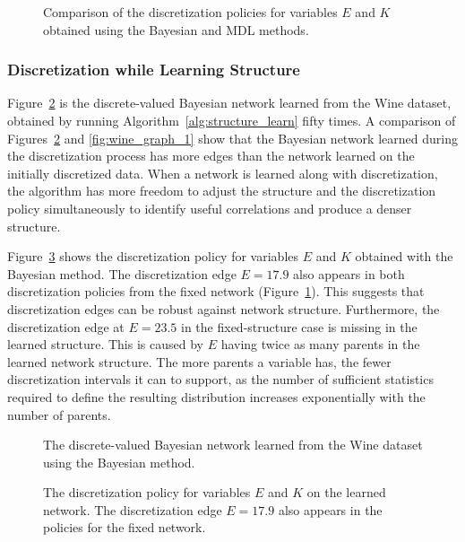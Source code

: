 \begin{figure}[ht]
  \centering
  
  \caption{Comparison of the discretization policies for variables $E$ and $K$ obtained using the Bayesian and MDL methods.}
  \label{fig:wine_exp1_distr}
\end{figure}

\subsubsection{Discretization while Learning Structure}
\label{subsubsec:wine_exp2}

Figure~\ref{fig:wine_graph_2} is the discrete-valued Bayesian network learned from the Wine dataset, obtained by running Algorithm~\ref{alg:structure_learn} fifty times.
A comparison of Figures~\ref{fig:wine_graph_2} and \ref{fig:wine_graph_1} show that the Bayesian network learned during the discretization process has more edges than the network learned on the initially discretized data.
When a network is learned along with discretization, the algorithm has more freedom to adjust the structure and the discretization policy simultaneously to identify useful correlations and produce a denser structure.

Figure~\ref{fig:wine_exp2_distr} shows the discretization policy for variables $E$ and $K$ obtained with the Bayesian method.
The discretization edge $E = 17.9$ also appears in both discretization policies from the fixed network (Figure~\ref{fig:wine_exp1_distr}).
This suggests that discretization edges can be robust against network structure.
Furthermore, the discretization edge at $E = 23.5$ in the fixed-structure case is missing in the learned structure.
This is caused by $E$ having twice as many parents in the learned network structure.
The more parents a variable has, the fewer discretization intervals it can to support, as the number of sufficient statistics required to define the resulting distribution increases exponentially with the number of parents.

\begin{figure}[ht]
  \centering
  \scalebox{0.7}{}
  \caption{The discrete-valued Bayesian network learned from the Wine dataset using the Bayesian method.}
  \label{fig:wine_graph_2}
\end{figure}

\begin{figure}[ht]
  \centering
  
  \caption{
    The discretization policy for variables $E$ and $K$ on the learned network.
    The discretization edge $E = 17.9$ also appears in the policies for the fixed network.
  }
  \label{fig:wine_exp2_distr}
\end{figure}
%
%
